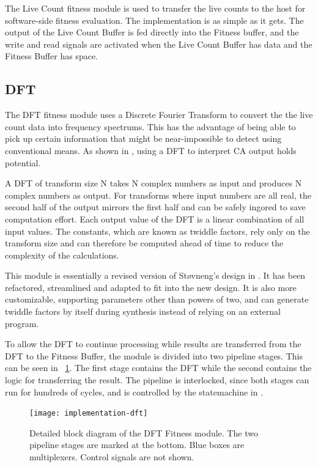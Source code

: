 The Live Count fitness module is used to transfer the live counts to the host for software-side fitness evaluation.
The implementation is as simple as it gets.
The output of the Live Count Buffer is fed directly into the Fitness buffer, and the write and read signals are activated when the Live Count Buffer has data and the Fitness Buffer has space.

\subsection{DFT}

The DFT fitness module uses a Discrete Fourier Transform to convert the the live count data into frequency spectrums.
This has the advantage of being able to pick up certain information that might be near-impossible to detect using conventional means.
As shown in , using a DFT to interpret CA output holds potential.

A DFT of transform size N takes N complex numbers as input and produces N complex numbers as output.
For transforms where input numbers are all real, the second half of the output mirrors the first half and can be safely ingored to save computation effort.
Each output value of the DFT is a linear combination of all input values.
The constants, which are known as twiddle factors, rely only on the transform size and can therefore be computed ahead of time to reduce the complexity of the calculations.
\CN

This module is essentially a revised version of Støvneng's design in \cite{stovneng2014sblock}.
It has been refactored, streamlined and adapted to fit into the new design.
It is also more customizable, supporting parameters other than powers of two, and can generate twiddle factors by itself during synthesis instead of relying on an external program.

To allow the DFT to continue processing while results are transferred from the DFT to the Fitness Buffer, the module is divided into two pipeline stages.
This can be seen in \figurename~\ref{fig:implementation-dft}.
The first stage contains the DFT while the second contains the logic for transferring the result.
The pipeline is interlocked, since both stages can run for hundreds of cycles, and is controlled by the statemachine in .

\begin{figure}[!ht]
    \centering
    \texttt{[image: implementation-dft]}
    \caption[DFT Fitness]{
        Detailed block diagram of the DFT Fitness module.
        The two pipeline stages are marked at the bottom.
        Blue boxes are multiplexers.
        Control signals are not shown.
    }
    \label{fig:implementation-dft}
\end{figure}

